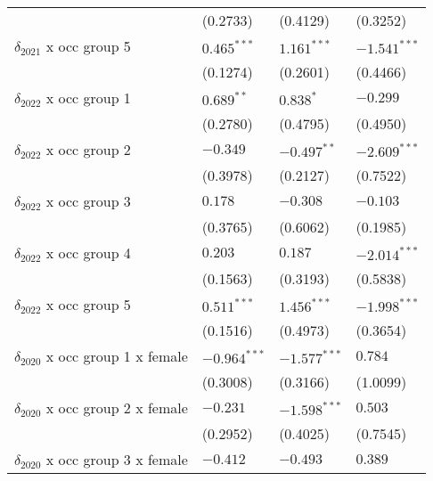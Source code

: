 \begin{tabular}{llll}
                                       &           (0.2733) &           (0.4129) &           (0.3252) \\
$\delta_{2021}$ x occ group 5          &      $0.465^{***}$ &      $1.161^{***}$ &     $-1.541^{***}$ \\
                                       &           (0.1274) &           (0.2601) &           (0.4466) \\
$\delta_{2022}$ x occ group 1          &       $0.689^{**}$ &          $0.838^*$ &           $-0.299$ \\
                                       &           (0.2780) &           (0.4795) &           (0.4950) \\
$\delta_{2022}$ x occ group 2          &           $-0.349$ &      $-0.497^{**}$ &     $-2.609^{***}$ \\
                                       &           (0.3978) &           (0.2127) &           (0.7522) \\
$\delta_{2022}$ x occ group 3          &            $0.178$ &           $-0.308$ &           $-0.103$ \\
                                       &           (0.3765) &           (0.6062) &           (0.1985) \\
$\delta_{2022}$ x occ group 4          &            $0.203$ &            $0.187$ &     $-2.014^{***}$ \\
                                       &           (0.1563) &           (0.3193) &           (0.5838) \\
$\delta_{2022}$ x occ group 5          &      $0.511^{***}$ &      $1.456^{***}$ &     $-1.998^{***}$ \\
                                       &           (0.1516) &           (0.4973) &           (0.3654) \\
$\delta_{2020}$ x occ group 1 x female &     $-0.964^{***}$ &     $-1.577^{***}$ &            $0.784$ \\
                                       &           (0.3008) &           (0.3166) &           (1.0099) \\
$\delta_{2020}$ x occ group 2 x female &           $-0.231$ &     $-1.598^{***}$ &            $0.503$ \\
                                       &           (0.2952) &           (0.4025) &           (0.7545) \\
$\delta_{2020}$ x occ group 3 x female &           $-0.412$ &           $-0.493$ &            $0.389$ \\

\end{tabular}
